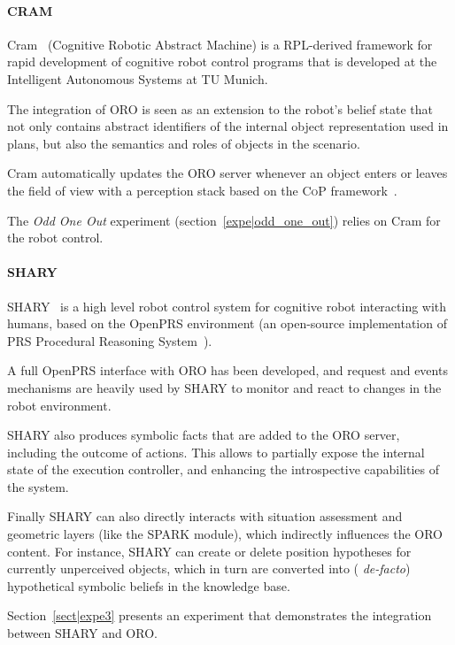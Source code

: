 \paragraph{CRAM}
\label{sect|cram}

{\sc Cram}~\cite{Beetz2010} (Cognitive Robotic Abstract Machine) is a
RPL-derived framework for rapid development of cognitive robot control programs
that is developed at the Intelligent Autonomous Systems at TU Munich.

The integration of ORO is seen as an extension to the robot's belief state that
not only contains abstract identifiers of the internal object representation
used in plans, but also the semantics and roles of objects in the scenario.

{\sc Cram} automatically updates the ORO server whenever an object enters or
leaves the field of view with a perception stack based on the \textsc{CoP}
framework~\cite{Klank2009}.

The \emph{Odd One Out} experiment (section~\ref{expe|odd_one_out}) relies on
{\sc Cram} for the robot control.

\paragraph{SHARY}

SHARY~\cite{Warnier2012} is a high level robot control system for cognitive
robot interacting with humans, based on the {\sc OpenPRS} environment (an
open-source implementation of PRS Procedural Reasoning
System~\cite{Ingrand1992}).

A full {\sc OpenPRS} interface with ORO has been developed, and request and
events mechanisms are heavily used by SHARY to monitor and react to changes in
the robot environment.

SHARY also produces symbolic facts that are added to the ORO server, including
the outcome of actions. This allows to partially expose the internal state of
the execution controller, and enhancing the introspective capabilities of the
system.

Finally SHARY can also directly interacts with situation assessment and
geometric layers (like the SPARK module), which indirectly influences the ORO
content. For instance, SHARY can create or delete position hypotheses for
currently unperceived objects, which in turn are converted into ({\it
de-facto}) hypothetical symbolic beliefs in the knowledge base.

Section~\ref{sect|expe3} presents an experiment that demonstrates the
integration between SHARY and ORO.

